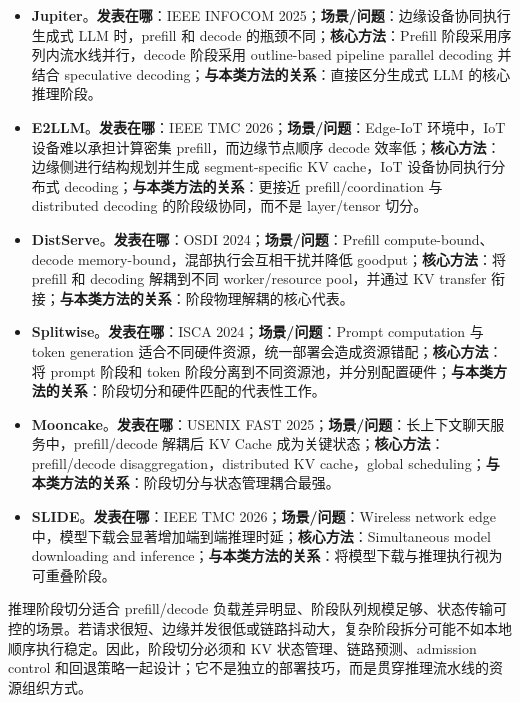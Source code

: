 \documentclass[a4paper,twocolumn,10pt]{ctexart}
\begin{document}
\begin{itemize}
\item \textbf{Jupiter}。\textbf{发表在哪}：IEEE INFOCOM 2025；\textbf{场景/问题}：边缘设备协同执行生成式 LLM 时，prefill 和 decode 的瓶颈不同；\textbf{核心方法}：Prefill 阶段采用序列内流水线并行，decode 阶段采用 outline-based pipeline parallel decoding 并结合 speculative decoding；\textbf{与本类方法的关系}：直接区分生成式 LLM 的核心推理阶段。
\item \textbf{E2LLM}。\textbf{发表在哪}：IEEE TMC 2026；\textbf{场景/问题}：Edge-IoT 环境中，IoT 设备难以承担计算密集 prefill，而边缘节点顺序 decode 效率低；\textbf{核心方法}：边缘侧进行结构规划并生成 segment-specific KV cache，IoT 设备协同执行分布式 decoding；\textbf{与本类方法的关系}：更接近 prefill/coordination 与 distributed decoding 的阶段级协同，而不是 layer/tensor 切分。
\item \textbf{DistServe}。\textbf{发表在哪}：OSDI 2024；\textbf{场景/问题}：Prefill compute-bound、decode memory-bound，混部执行会互相干扰并降低 goodput；\textbf{核心方法}：将 prefill 和 decoding 解耦到不同 worker/resource pool，并通过 KV transfer 衔接；\textbf{与本类方法的关系}：阶段物理解耦的核心代表。
\item \textbf{Splitwise}。\textbf{发表在哪}：ISCA 2024；\textbf{场景/问题}：Prompt computation 与 token generation 适合不同硬件资源，统一部署会造成资源错配；\textbf{核心方法}：将 prompt 阶段和 token 阶段分离到不同资源池，并分别配置硬件；\textbf{与本类方法的关系}：阶段切分和硬件匹配的代表性工作。
\item \textbf{Mooncake}。\textbf{发表在哪}：USENIX FAST 2025；\textbf{场景/问题}：长上下文聊天服务中，prefill/decode 解耦后 KV Cache 成为关键状态；\textbf{核心方法}：prefill/decode disaggregation，distributed KV cache，global scheduling；\textbf{与本类方法的关系}：阶段切分与状态管理耦合最强。
\item \textbf{SLIDE}。\textbf{发表在哪}：IEEE TMC 2026；\textbf{场景/问题}：Wireless network edge 中，模型下载会显著增加端到端推理时延；\textbf{核心方法}：Simultaneous model downloading and inference；\textbf{与本类方法的关系}：将模型下载与推理执行视为可重叠阶段。
\end{itemize}





推理阶段切分适合 prefill/decode 负载差异明显、阶段队列规模足够、状态传输可控的场景。若请求很短、边缘并发很低或链路抖动大，复杂阶段拆分可能不如本地顺序执行稳定。因此，阶段切分必须和 KV 状态管理、链路预测、admission control 和回退策略一起设计；它不是独立的部署技巧，而是贯穿推理流水线的资源组织方式。
\end{document}
